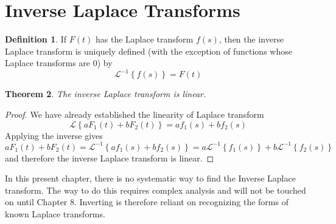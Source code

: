 \documentclass{report}
\newtheorem{theorem}{Theorem}[chapter]
\theoremstyle{definition}
\newtheorem{definition}[theorem]{Definition}
\theoremstyle{remark}
\newcommand{\lapt}[1]{\mathscr{L}\left\{ #1\right\}}
\newcommand{\inlt}[1]{\mathscr{L}^{-1} \left\{ #1 \right\}}
\begin{document}
\section{Inverse Laplace Transforms}
\begin{definition}
    If $F(t)$ has the Laplace transform $f(s)$, then the inverse Laplace transform is uniquely defined (with the exception of functions whose Laplace transforms are 0) by 
    \begin{equation*}
        \inlt{f(s)} = F(t)
    \end{equation*}
\end{definition}
\begin{theorem}
    The inverse Laplace transform is linear.
\end{theorem}
\begin{proof}
    We have already established the linearity of Laplace transform 
    \begin{equation*}
        \lapt{aF_1(t)+bF_2(t)} = af_1(s) + bf_2(s)
    \end{equation*}
    Applying the inverse gives 
    \begin{equation*}
        aF_1(t)+bF_2(t) = \inlt{af_1(s) + bf_2(s)} = a\inlt{f_1(s)} + b\inlt{f_2(s)}
    \end{equation*}
    and therefore the inverse Laplace transform is linear.
\end{proof}
In this present chapter, there is no systematic way to find the Inverse Laplace transform. The way to do this requires complex analysis and will not be touched on until Chapter 8. Inverting is therefore reliant on recognizing the forms of known Laplace transforms. 
\end{document}
